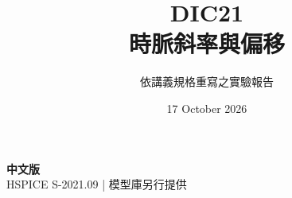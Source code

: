 \documentclass[11pt,a4paper]{article}
\title{\color{accent}DIC21\\[4pt]時脈斜率與偏移}
\author{依講義規格重寫之實驗報告}
\date{17 October 2026}
\begin{document}
\maketitle
\begin{center}\small\textbf{中文版}\\
HSPICE S-2021.09 \quad | \quad 模型庫另行提供
\end{center}


\end{document}
